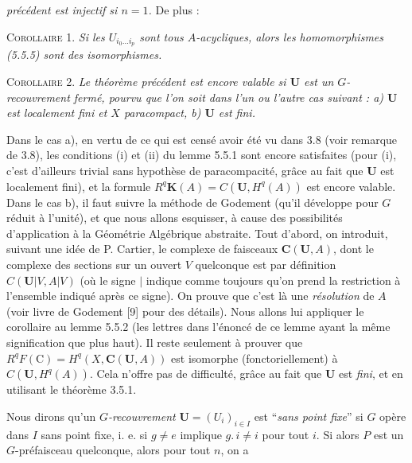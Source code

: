 \clearpage
{}

\noindent\textit{précédent est injectif si $n=1$.} De plus :

\textsc{Corollaire 1.} \textit{Si les $U_{i_0\ldots i_p}$ sont tous
$A$-acycliques, alors les homomorphismes \textup{(5.5.5)} sont des isomorphismes.}

\textsc{Corollaire 2.} \textit{Le théorème précédent est encore
valable si ${\mathbf U}$ est un $G$-recouvrement fermé, pourvu que l'on soit dans
l'un ou l'autre cas suivant : a) ${\mathbf U}$ est localement fini et $X$
paracompact, b) ${\mathbf U}$ est fini.}

Dans le cas a), en vertu de ce qui est censé avoir été vu dans 3.8 (voir
remarque de 3.8), les conditions (i) et (ii) du lemme 5.5.1 sont encore
satisfaites (pour (i), c'est d'ailleurs trivial sans hypothèse de
paracompacité, grâce au fait que ${\mathbf U}$ est localement fini), et la
formule $R^q\mathbf K(A)=C({\mathbf U},H^q(A))$ est encore valable. Dans le cas
b), il faut suivre la méthode de Godement (qu'il développe pour $G$ réduit à
l'unité), et que nous allons esquisser, à cause des possibilités d'application
à la Géométrie Algébrique abstraite. Tout d'abord, on introduit, suivant une
idée de P. Cartier, le complexe de faisceaux ${\mathbf C}({\mathbf U},A)$, dont le complexe
des sections sur un ouvert $V$ quelconque est par définition
$C({\mathbf U}|V,A|V)$ (où le signe $|$ indique comme toujours qu'on prend la
restriction à l'ensemble indiqué après ce signe). On prouve que c'est là une
\emph{résolution} de $A$ (voir livre de Godement [9] pour des détails). Nous allons lui
appliquer le corollaire au lemme 5.5.2 (les lettres dans l'énoncé de ce lemme
ayant la même signification que plus haut). Il reste seulement à prouver que
$R^qF(\mathrm C)=H^q(X,{\mathbf C}({\mathbf U},A))$ est isomorphe (fonctoriellement) à
$C({\mathbf U},H^q(A))$. Cela n'offre pas de difficulté, grâce au fait que
${\mathbf U}$ est \emph{fini}, et en utilisant le théorème 3.5.1.

Nous dirons qu'un \emph{$G$-recouvrement} ${\mathbf U}=(U_i)_{i\in I}$ est ``\emph{sans point fixe}'' si $G$ opère dans $I$ sans point fixe, i. e. si $g\ne e$ implique
$g.\, i\ne i$ pour tout $i$. Si alors $P$ est un $G$-préfaisceau quelconque,
alors pour tout $n$, on a

